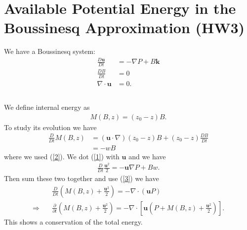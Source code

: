 \documentclass[11pt,letterpaper]{book}
\theoremstyle{definition}
\newcommand{\pe}{\partial}
\newcommand{\ve}[1]{\boldsymbol{#1}}
\newcommand{\thus}{\Rightarrow \quad }
\begin{document}
\section{Available Potential Energy in the Boussinesq Approximation (HW3)}
We have a Boussinesq system:
\begin{align}
\frac{D\ve u}{Dt} &= -\nabla P+B\ve k\label{1}\\
\frac{DB}{Dt} &= 0\label{2}\\
\nabla\cdot\ve u &= 0\label{3}.
\end{align}

\subsection{}
We define internal energy as
\begin{align*}
M(B,z) = (z_0-z)B.
\end{align*}
To study its evolution we have
\begin{align*}
\frac{D}{D t}M(B,z) &= (\ve u\cdot\nabla)(z_0-z)B+(z_0-z)\frac{DB}{Dt}\\
&= -wB
\end{align*}
where we used (\ref{2}). We dot (\ref{1}) with $\ve u$ and we have
\begin{align*}
\frac{D}{Dt}\frac{\ve u^2}{2} = -\ve u\nabla P+Bw.
\end{align*}
Then sum these two together and use (\ref{3}) we have
\begin{align*}
&\frac{D}{Dt}\left(M(B,z)+\frac{\ve u^2}{2}\right) = -\nabla\cdot(\ve u P)\\
\thus &\frac{\pe}{\pe t}\left(M(B,z)+\frac{\ve u^2}{2}\right) = -\nabla\cdot\left[ \ve u\left( P+M(B,z)+\frac{\ve u^2}{2}\right)\right].
\end{align*}
This shows a conservation of the total energy. 
\end{document}
